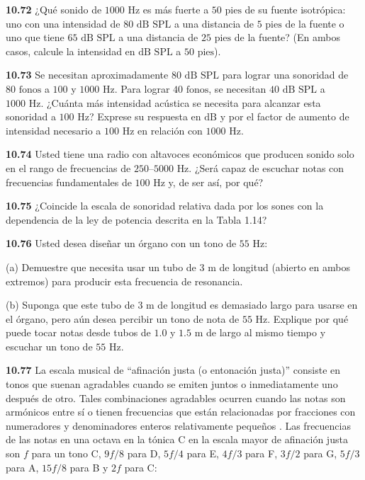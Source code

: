 \documentclass[12pt]{book}
\begin{document}
\noindent \textbf{10.72} ¿Qué sonido de $1000\text{ Hz}$ es más fuerte a $50\text{ pies}$ de su fuente isotrópica: uno con una intensidad de $80\text{ dB SPL}$ a una distancia de $5\text{ pies}$ de la fuente o uno que tiene $65\text{ dB SPL}$ a una distancia de $25\text{ pies}$ de la fuente? (En ambos casos, calcule la intensidad en $\text{dB SPL}$ a $50\text{ pies}$).

\noindent \textbf{10.73} Se necesitan aproximadamente $80\text{ dB SPL}$ para lograr una sonoridad de $80\text{ fonos}$ a $100$ y $1000\text{ Hz}$. Para lograr $40\text{ fonos}$, se necesitan $40\text{ dB SPL}$ a $1000\text{ Hz}$. ¿Cuánta más intensidad acústica se necesita para alcanzar esta sonoridad a $100\text{ Hz}$? Exprese su respuesta en $\text{dB}$ y por el factor de aumento de intensidad necesario a $100\text{ Hz}$ en relación con $1000\text{ Hz}$.

\noindent \textbf{10.74} Usted tiene una radio con altavoces económicos que producen sonido solo en el rango de frecuencias de $250\text{--}5000\text{ Hz}$. ¿Será capaz de escuchar notas con frecuencias fundamentales de $100\text{ Hz}$ y, de ser así, por qué?

\noindent \textbf{10.75} ¿Coincide la escala de sonoridad relativa dada por los sones con la dependencia de la ley de potencia descrita en la Tabla 1.14?

\noindent \textbf{10.76} Usted desea diseñar un órgano con un tono de $55\text{ Hz}$:

(a) Demuestre que necesita usar un tubo de $3\text{ m}$ de longitud (abierto en ambos extremos) para producir esta frecuencia de resonancia.

(b) Suponga que este tubo de $3\text{ m}$ de longitud es demasiado largo para usarse en el órgano, pero aún desea percibir un tono de nota de $55\text{ Hz}$. Explique por qué puede tocar notas desde tubos de $1.0$ y $1.5\text{ m}$ de largo al mismo tiempo y escuchar un tono de $55\text{ Hz}$.

\noindent \textbf{10.77} La escala musical de ``afinación justa (o entonación justa)'' consiste en tonos que suenan agradables cuando se emiten juntos o inmediatamente uno después de otro. Tales combinaciones agradables ocurren cuando las notas son armónicos entre sí o tienen frecuencias que están relacionadas por fracciones con numeradores y denominadores enteros relativamente pequeños \cite{54}. Las frecuencias de las notas en una octava en la tónica C en la escala mayor de afinación justa son $f$ para un tono C, $9f/8$ para D, $5f/4$ para E, $4f/3$ para F, $3f/2$ para G, $5f/3$ para A, $15f/8$ para B y $2f$ para C:
\end{document}
